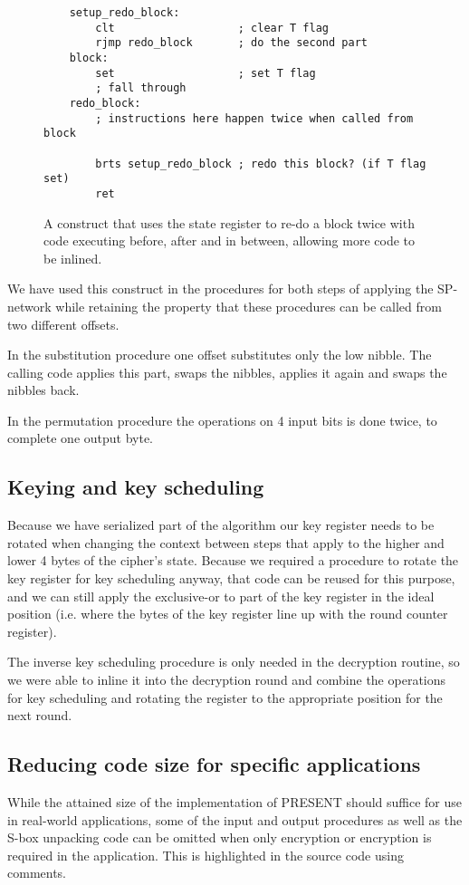 \documentclass{llncs}
\begin{document}
\begin{figure}
	\begin{lstlisting}
	setup_redo_block:
		clt                   ; clear T flag
		rjmp redo_block       ; do the second part
	block:
		set                   ; set T flag
		; fall through
	redo_block:
		; instructions here happen twice when called from block

		brts setup_redo_block ; redo this block? (if T flag set)
		ret
	\end{lstlisting}
	\caption{A construct that uses the state register to re-do a block twice with code executing before, after and in between, allowing more code to be inlined.}
\label{sreg_redo}
\end{figure}

We have used this construct in the procedures for both steps of applying the SP-network while retaining the property that these procedures can be called from two different offsets.

In the substitution procedure one offset substitutes only the low nibble.
The calling code applies this part, swaps the nibbles, applies it again and swaps the nibbles back.

In the permutation procedure the operations on 4 input bits is done twice, to complete one output byte.

\subsection{Keying and key scheduling}
Because we have serialized part of the algorithm our key register needs to be rotated when changing the context between steps that apply to the higher and lower 4 bytes of the cipher's state.
Because we required a procedure to rotate the key register for key scheduling anyway, that code can be reused for this purpose, and we can still apply the exclusive-or to part of the key register in the ideal position (i.e. where the bytes of the key register line up with the round counter register).

The inverse key scheduling procedure is only needed in the decryption routine, so we were able to inline it into the decryption round and combine the operations for key scheduling and rotating the register to the appropriate position for the next round.

\subsection{Reducing code size for specific applications}
While the attained size of the implementation of PRESENT should suffice for use in real-world applications, some of the input and output procedures as well as the S-box unpacking code can be omitted when only encryption or encryption is required in the application.
This is highlighted in the source code using comments.
\end{document}
